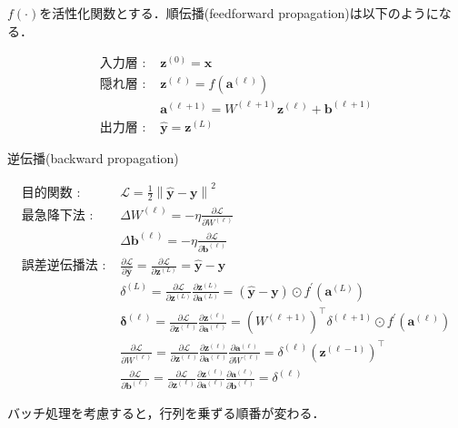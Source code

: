 $f(\cdot)$を活性化関数とする．順伝播(feedforward propagation)は以下のようになる．


\begin{align}
\text{入力層 : }&\mathbf{z}^{(0)}=\mathbf{x}\\
\text{隠れ層 : }&\mathbf{z}^{(\ell)}=f\left(\mathbf{a}^{(\ell)}\right)\\
&\mathbf{a}^{(\ell+1)}=W^{(\ell+1)}\mathbf{z}^{(\ell)}+\mathbf{b}^{(\ell+1)}\\
\text{出力層 : }&\hat{\mathbf{y}}=\mathbf{z}^{(L)}
\end{align}


逆伝播(backward propagation)


\begin{align}
\text{目的関数 : }&\mathcal{L}=\frac{1}{2}\left\|\hat{\mathbf{y}}-\mathbf{y}\right\|^{2}\\
\text{最急降下法 : }&\Delta W^{(\ell)}=-\eta \frac{\partial \mathcal{L}}{\partial W^{(\ell)}}\\
&\Delta \mathbf{b}^{(\ell)}=-\eta \frac{\partial \mathcal{L}}{\partial \mathbf{b}^{(\ell)}}\\
\text{誤差逆伝播法 : }&\frac{\partial \mathcal{L}}{\partial \hat{\mathbf{y}}}=\frac{\partial \mathcal{L}}{\partial \mathbf{z}^{(L)}}=\hat{\mathbf{y}}-\mathbf{y}\\
&\delta^{(L)}=\frac{\partial \mathcal{L}}{\partial \mathbf{z}^{(L)}} \frac{\partial \mathbf{z}^{(L)}}{\partial \mathbf{a}^{(L)}}=\left(\hat{\mathbf{y}}-\mathbf{y}\right) \odot f^{\prime}\left(\mathbf{a}^{(L)}\right)\\
&\mathbf{\delta}^{(\ell)}=\frac{\partial \mathcal{L}}{\partial \mathbf{z}^{(\ell)}} \frac{\partial \mathbf{z}^{(\ell)}}{\partial \mathbf{a}^{(\ell)}}=\left(W^{(\ell+1)}\right)^\top \delta^{(\ell+1)} \odot f^{\prime}\left(\mathbf{a}^{(\ell)}\right)\\
&\frac{\partial \mathcal{L}}{\partial W^{(\ell)}}=\frac{\partial \mathcal{L}}{\partial \mathbf{z}^{(\ell)}} \frac{\partial \mathbf{z}^{(\ell)}}{\partial \mathbf{a}^{(\ell)}} \frac{\partial \mathbf{a}^{(\ell)}}{\partial W^{(\ell)}}=\delta^{(\ell)}\left(\mathbf{z}^{(\ell-1)}\right)^\top\\
&\frac{\partial \mathcal{L}}{\partial \mathbf{b}^{(\ell)}}=\frac{\partial \mathcal{L}}{\partial \mathbf{z}^{(\ell)}} \frac{\partial \mathbf{z}^{(\ell)}}{\partial \mathbf{a}^{(\ell)}} \frac{\partial \mathbf{a}^{(\ell)}}{\partial \mathbf{b}^{(\ell)}}=\delta^{(\ell)}
\end{align}


バッチ処理を考慮すると，行列を乗ずる順番が変わる．
